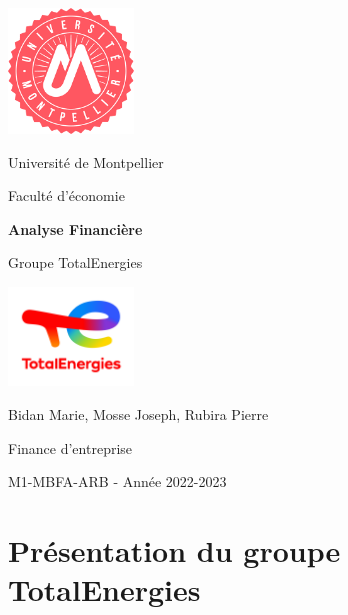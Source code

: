 \documentclass[12pt]{article}
\begin{document}
\begin{titlepage}
    \centering
    \includegraphics[width=0.25\textwidth]{um.png}\par\vspace{0.5cm}
    {\Large Université de Montpellier \par}
    {\large Faculté d'économie\par}
    \vfill
    {\huge\bfseries Analyse Financière\par}
    \vspace{0.1cm}
    {\Large Groupe TotalEnergies\par}
    \vspace{0.5cm}
    \includegraphics[width=0.25\textwidth]{total.png}\par\vspace{0.5cm}
    \vfill
    {\Large Bidan Marie, Mosse Joseph, Rubira Pierre\par}
    \vfill
    {\large Finance d'entreprise \par}
    {M1-MBFA-ARB - Année 2022-2023\par}

\end{titlepage}
\pagestyle{fancy}
\fancyhead{}
\fancyhead[L]{\leftmark }
\fancyfoot{} 
\fancyfoot[R]{\thepage}


\section{Présentation du groupe TotalEnergies}
\end{document}

